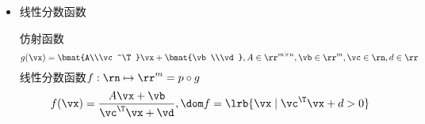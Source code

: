 \begin{itemize}
	\item 线性分数函数
\begin{definition}[线性分数函数]
仿射函数
\[g(\vx)=\bmat{A\\\vc^\T}\vx+\bmat{\vb\\\vd},A\in\rr^{m\times n},\vb\in\rr^m,\vc\in\rn,d\in\rr\]
线性分数函数$f:\rn\mapsto\rr^m=p\circ g$
\[f(\vx)=\frac{A\vx+\vb}{\vc^\T \vx+\vd},\dom f=\lrb{\vx\mid \vc^\T\vx+d>0}\]
\end{definition}

\end{itemize}